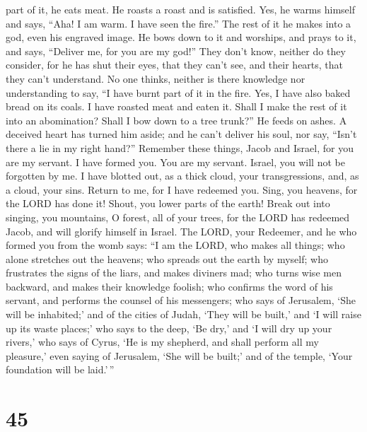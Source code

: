 part of it, he eats meat. He roasts a roast and is satisfied. Yes, he
warms himself and says, ``Aha! I am warm. I have seen the fire.''
 The rest of it he makes into a god, even his engraved
image. He bows down to it and worships, and prays to it, and says,
``Deliver me, for you are my god!''  They don't know,
neither do they consider, for he has shut their eyes, that they can't
see, and their hearts, that they can't understand.  No one
thinks, neither is there knowledge nor understanding to say, ``I have
burnt part of it in the fire. Yes, I have also baked bread on its coals.
I have roasted meat and eaten it. Shall I make the rest of it into an
abomination? Shall I bow down to a tree trunk?''  He feeds
on ashes. A deceived heart has turned him aside; and he can't deliver
his soul, nor say, ``Isn't there a lie in my right hand?'' 
Remember these things, Jacob and Israel, for you are my servant. I have
formed you. You are my servant. Israel, you will not be forgotten by me.
 I have blotted out, as a thick cloud, your transgressions,
and, as a cloud, your sins. Return to me, for I have redeemed you.
 Sing, you heavens, for the LORD has done it! Shout, you
lower parts of the earth! Break out into singing, you mountains, O
forest, all of your trees, for the LORD has redeemed Jacob, and will
glorify himself in Israel.  The LORD, your Redeemer, and he
who formed you from the womb says: ``I am the LORD, who makes all
things; who alone stretches out the heavens; who spreads out the earth
by myself;  who frustrates the signs of the liars, and
makes diviners mad; who turns wise men backward, and makes their
knowledge foolish;  who confirms the word of his servant,
and performs the counsel of his messengers; who says of Jerusalem, `She
will be inhabited;' and of the cities of Judah, `They will be built,'
and `I will raise up its waste places;'  who says to the
deep, `Be dry,' and `I will dry up your rivers,'  who says
of Cyrus, `He is my shepherd, and shall perform all my pleasure,' even
saying of Jerusalem, `She will be built;' and of the temple, `Your
foundation will be laid.'\,''

\hypertarget{section-44}{%
\section{45}\label{section-44}}

